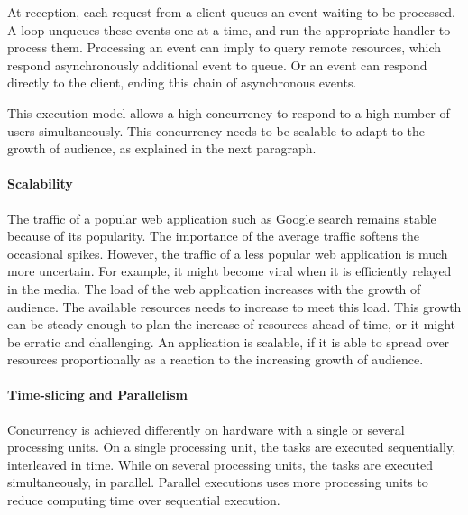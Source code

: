 At reception, each request from a client queues an event waiting to be processed.
A loop unqueues these events one at a time, and run the appropriate handler to process them.
Processing an event can imply to query remote resources, which respond asynchronously additional event to queue.
Or an event can respond directly to the client, ending this chain of asynchronous events.


This execution model allows a high concurrency to respond to a high number of users simultaneously.
This concurrency needs to be scalable to adapt to the growth of audience, as explained in the next paragraph.

\paragraph{Scalability}

The traffic of a popular web application such as Google search remains stable because of its popularity.
The importance of the average traffic softens the occasional spikes.
However, the traffic of a less popular web application is much more uncertain.
For example, it might become viral when it is efficiently relayed in the media.
The load of the web application increases with the growth of audience.
The available resources needs to increase to meet this load.
This growth can be steady enough to plan the increase of resources ahead of time, or it might be erratic and challenging.
An application is scalable, if it is able to spread over resources proportionally as a reaction to the increasing growth of audience.

\paragraph{Time-slicing and Parallelism}

Concurrency is achieved differently on hardware with a single or several processing units.
On a single processing unit, the tasks are executed sequentially, interleaved in time.
While on several processing units, the tasks are executed simultaneously, in parallel.
Parallel executions uses more processing units to reduce computing time over sequential execution.


